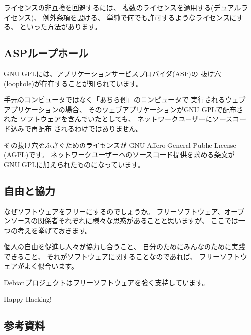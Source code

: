 \documentclass[mingoth,a4paper]{jsarticle}
\begin{document}
ライセンスの非互換を回避するには、
複数のライセンスを適用する(デュアルライセンス)、
例外条項を設ける、
単純で何でも許可するようなライセンスにする、
といった方法があります。

\subsection{ASPループホール}

GNU GPLには、アプリケーションサービスプロバイダ(ASP)の
抜け穴(loophole)が存在することが知られています。

手元のコンピュータではなく「あちら側」のコンピュータで
実行されるウェブアプリケーションの場合、
そのウェブアプリケーションがGNU GPLで配布された
ソフトウェアを含んでいたとしても、
ネットワークユーザーにソースコード込みで再配布
されるわけではありません。

その抜け穴をふさぐためのライセンスが
GNU Affero General Public License (AGPL)です。
ネットワークユーザーへのソースコード提供を求める条文が
GNU GPLに加えられたものになっています。

\subsection{自由と協力}

なぜソフトウェアをフリーにするのでしょうか。
フリーソフトウェア、オープンソースの関係者それぞれに様々な思惑があることと思いますが、
ここでは一つの考えを挙げておきます。

個人の自由を促進し人々が協力し合うこと、
自分のためにみんなのために実践できること、
それがソフトウェアに関することなのであれば、
フリーソフトウェアがよく似合います。

Debianプロジェクトはフリーソフトウェアを強く支持しています。

Happy Hacking!

\subsection{参考資料}
\end{document}
